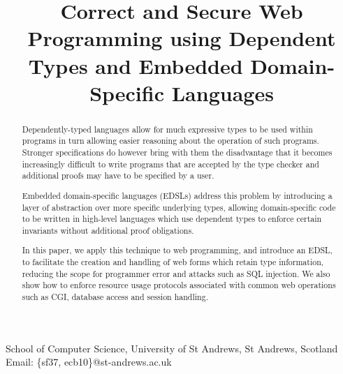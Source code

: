 \documentclass[preprint]{sigplanconf}
\begin{document}
\newcommand{\idris}{\textsc{Idris}}
\newcommand{\idata}{\textsf{iData}}
\newcommand{\itasks}{\textsf{iTasks}}
\setlength{\pdfpageheight}{\paperheight}
\setlength{\pdfpagewidth}{\paperwidth}





\titlebanner{}        %
\preprintfooter{}   %

\title{Correct and Secure Web Programming using Dependent Types and Embedded Domain-Specific Languages}

           {School of Computer Science, University of St Andrews, St Andrews, Scotland}
           {Email: \{sf37, ecb10\}@st-andrews.ac.uk}

\maketitle

\begin{abstract}
Dependently-typed languages allow for much expressive types to be used within
programs in turn allowing easier reasoning about the operation of such
programs. Stronger specifications do however bring with them the disadvantage
that it becomes increasingly difficult to write programs that are accepted by
the type checker and additional proofs may have to be specified by a user.

Embedded domain-specific languages (EDSLs) address this problem by introducing
a layer of abstraction over more specific underlying types, allowing
domain-specific code to be written in high-level languages which use dependent
types to enforce certain invariants without additional proof obligations. 

In this paper, we apply this technique to web programming, and introduce an
EDSL, to facilitate the creation and handling of web forms which retain type
information, reducing the scope for programmer error and attacks such as SQL
injection. We also show how to enforce resource usage
protocols associated with common web operations such as CGI, database access
and session handling.  

\end{abstract}
\end{document}
